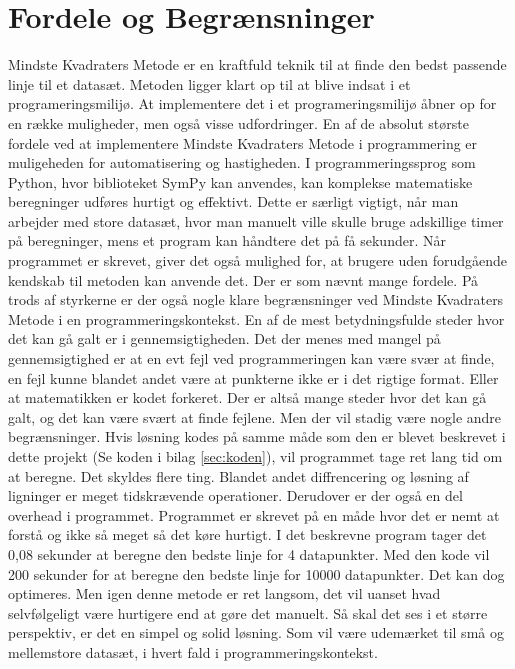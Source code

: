 \section{Fordele og Begrænsninger}\label{sec:fordeleOgBegrensninger}
Mindste Kvadraters Metode er en kraftfuld teknik til at finde den bedst passende linje til et datasæt. Metoden ligger klart op til at blive indsat i et programeringsmilijø. At implementere det i et programeringsmilijø åbner op for en række muligheder, men også visse udfordringer. En af de absolut største fordele ved at implementere Mindste Kvadraters Metode i programmering er muligeheden for automatisering og hastigheden. I programmeringssprog som Python, hvor biblioteket SymPy kan anvendes, kan komplekse matematiske beregninger udføres hurtigt og effektivt. Dette er særligt vigtigt, når man arbejder med store datasæt, hvor man manuelt ville skulle bruge adskillige timer på beregninger, mens et program kan håndtere det på få sekunder. Når programmet er skrevet, giver det også mulighed for, at brugere uden forudgående kendskab til metoden kan anvende det. Der er som nævnt mange fordele. På trods af styrkerne er der også nogle klare begrænsninger ved Mindste Kvadraters Metode i en programmeringskontekst. En af de mest betydningsfulde steder hvor det kan gå galt er i gennemsigtigheden. Det der menes med mangel på gennemsigtighed er at en evt fejl ved programmeringen kan være svær at finde, en fejl kunne blandet andet være at punkterne ikke er i det rigtige format. Eller at matematikken er kodet forkeret. Der er altså mange steder hvor det kan gå galt, og det kan være svært at finde fejlene. Men der vil stadig være nogle andre begrænsninger. Hvis løsning kodes på samme måde som den er blevet beskrevet i dette projekt (Se koden i bilag \ref{sec:koden}), vil programmet tage ret lang tid om at beregne. Det skyldes flere ting. Blandet andet diffrencering og løsning af ligninger er meget tidskrævende operationer. Derudover er der også en del overhead i programmet. Programmet er skrevet på en måde hvor det er nemt at forstå og ikke så meget så det køre hurtigt. I det beskrevne program tager det 0,08 sekunder at beregne den bedste linje for 4 datapunkter. Med den kode vil 200 sekunder for at beregne den bedste linje for 10000 datapunkter. Det kan dog optimeres. Men igen denne metode er ret langsom, det vil uanset hvad selvfølgeligt være hurtigere end at gøre det manuelt. Så skal det ses i et større perspektiv, er det en simpel og solid løsning. Som vil være udemærket til små og mellemstore datasæt, i hvert fald i programmeringskontekst.

